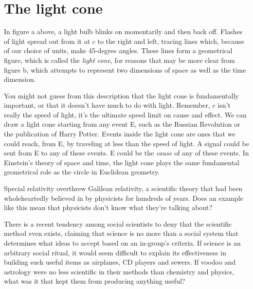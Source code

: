 \pagebreak

\section{The light cone}




In figure a above, a light bulb blinks on momentarily and then back off. Flashes of light spread out from
it at $c$ to the right and left, tracing lines which, because of our choice of units, make 45-degree angles.
These lines form a geometrical figure, which is called the \emph{light cone}, for reasons that may be more
clear from figure b, which attempts to represent two dimensions of space as well as the time dimension.

You might not guess from this description that the light cone is fundamentally important, or that it
doesn't have much to do with light. Remember, $c$ isn't really the speed of light, it's the ultimate
speed limit on cause and effect. We can draw a light cone starting from any event E, such as the
Russian Revolution or the publication of Harry Potter. Events inside the light cone are ones that we could
reach, from E, by traveling at less than the speed of light. A signal could be sent from E to any of these
events. E could be the \emph{cause} of any of these events.
In Einstein's theory of space and time, the light cone plays the same fundamental geometrical role
as the circle in Euclidean geometry.

\pagebreak


Special relativity overthrew Galilean relativity, a scientific theory that had been wholeheartedly believed in by
physicists for hundreds of years.
Does an example like this mean that physicists don't know what they're talking about?

There is a recent tendency among social scientists to 
deny that the scientific method even exists, claiming that
science is no more than a social system that
determines what ideas to accept based on an in-group's
criteria. If science is an
arbitrary social ritual, it would seem difficult to explain
its effectiveness in building such useful items as
airplanes, CD players and sewers. If voodoo
and astrology were no less scientific in
their methods than chemistry and physics, what was it that
kept them from producing anything useful?

